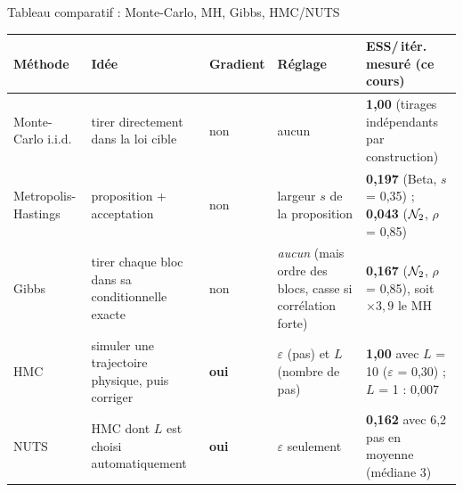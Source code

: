 \begin{frame}{Tableau comparatif : Monte-Carlo, MH, Gibbs, HMC/NUTS}
\footnotesize
\begin{center}
\footnotesize
\begin{tabular}{@{}p{2.05cm}p{2.65cm}p{2.5cm}p{2.75cm}p{2.55cm}@{}}
\toprule
\textbf{Méthode} & \textbf{Idée} & \textbf{Gradient} & \textbf{Réglage} & \textbf{ESS/\,itér. mesuré (ce cours)} \\
\midrule
Monte-Carlo i.i.d. & tirer directement dans la loi cible & non &
aucun & \textbf{1,00} (tirages indépendants par construction) \\[0.3mm]
Metropolis-Hastings & proposition + acceptation & non &
largeur $s$ de la proposition & \textbf{0,197} (Beta, $s$ = 0,35) ; \textbf{0,043} ($\mathcal{N}_2$, $\rho$ = 0,85) \\[0.3mm]
Gibbs & tirer chaque bloc dans sa conditionnelle exacte & non &
\emph{aucun} (mais ordre des blocs, casse si corrélation forte) & \textbf{0,167} ($\mathcal{N}_2$, $\rho$ = 0,85), soit $\times 3{,}9$ le MH \\[0.3mm]
HMC & simuler une trajectoire physique, puis corriger & \textbf{oui} &
$\varepsilon$ (pas) et $L$ (nombre de pas) & \textbf{1,00} avec $L$ = 10 ($\varepsilon$ = 0,30) ; $L$ = 1 : 0,007 \\[0.3mm]
NUTS & HMC dont $L$ est choisi automatiquement & \textbf{oui} &
$\varepsilon$ seulement & \textbf{0,162} avec 6,2 pas en moyenne (médiane 3) \\
\bottomrule
\end{tabular}
\end{center}
\vspace{1mm}
\end{frame}

